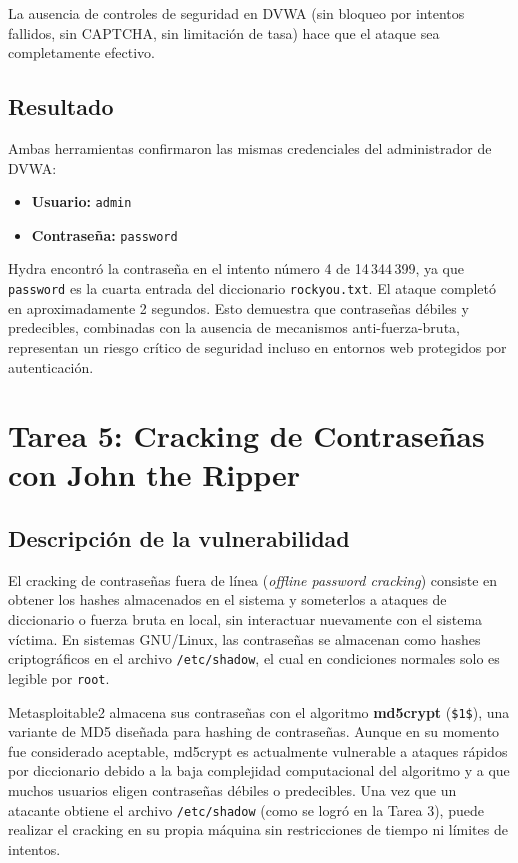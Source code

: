 \documentclass[12pt, letterpaper]{article}
\begin{document}
La ausencia de controles de seguridad en DVWA (sin bloqueo por intentos fallidos, sin CAPTCHA, sin limitación de tasa) hace que el ataque sea completamente efectivo.

\subsection{Resultado}

Ambas herramientas confirmaron las mismas credenciales del administrador de DVWA:

\begin{itemize}
    \item \textbf{Usuario:} \texttt{admin}
    \item \textbf{Contraseña:} \texttt{password}
\end{itemize}

Hydra encontró la contraseña en el intento número 4 de 14\,344\,399, ya que \texttt{password} es la cuarta entrada del diccionario \texttt{rockyou.txt}. El ataque completó en aproximadamente 2 segundos. Esto demuestra que contraseñas débiles y predecibles, combinadas con la ausencia de mecanismos anti-fuerza-bruta, representan un riesgo crítico de seguridad incluso en entornos web protegidos por autenticación.

\section{Tarea 5: Cracking de Contraseñas con John the Ripper}

\subsection{Descripción de la vulnerabilidad}

El cracking de contraseñas fuera de línea (\textit{offline password cracking}) consiste en obtener los hashes almacenados en el sistema y someterlos a ataques de diccionario o fuerza bruta en local, sin interactuar nuevamente con el sistema víctima. En sistemas GNU/Linux, las contraseñas se almacenan como hashes criptográficos en el archivo \texttt{/etc/shadow}, el cual en condiciones normales solo es legible por \texttt{root}.

Metasploitable2 almacena sus contraseñas con el algoritmo \textbf{md5crypt} (\texttt{\$1\$}), una variante de MD5 diseñada para hashing de contraseñas. Aunque en su momento fue considerado aceptable, md5crypt es actualmente vulnerable a ataques rápidos por diccionario debido a la baja complejidad computacional del algoritmo y a que muchos usuarios eligen contraseñas débiles o predecibles. Una vez que un atacante obtiene el archivo \texttt{/etc/shadow} (como se logró en la Tarea 3), puede realizar el cracking en su propia máquina sin restricciones de tiempo ni límites de intentos.
\end{document}
